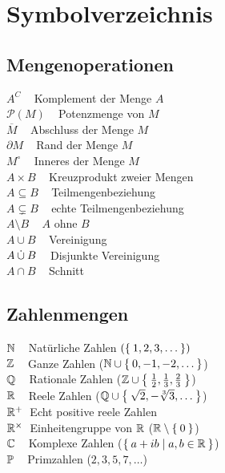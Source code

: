 \chapter*{Symbolverzeichnis}
\begin{minipage}[t]{0.45\textwidth}
\section*{Mengenoperationen}
$A^C\;\;\;$ Komplement der Menge $A$\\
$\mathcal{P}(M)\;\;\;$ Potenzmenge von $M$\\
$\overline{M}\;\;\;$ Abschluss der Menge $M$\\
$\partial M\;\;\;$ Rand der Menge $M$\\
$M^\circ\;\;\;$ Inneres der Menge $M$\\
$A \times B\;\;\;$ Kreuzprodukt zweier Mengen\\
$A \subseteq B\;\;\;$ Teilmengenbeziehung\\
$A \subsetneq B\;\;\;$ echte Teilmengenbeziehung\\
$A \setminus B\;\;\;$ $A$ ohne $B$\\
$A \cup B\;\;\;$ Vereinigung\\
$A \mathbin{\dot{\cup}} B\;\;\;$ Disjunkte Vereinigung\\
$A \cap B\;\;\;$ Schnitt\\
\section*{Zahlenmengen}
$\mathbb{N}\;\;\;$ Natürliche Zahlen $(\Set{1, 2, 3, \dots})$\\
$\mathbb{Z}\;\;\;$ Ganze Zahlen ($\mathbb{N} \cup \Set{0, -1, -2, \dots}$)\\
$\mathbb{Q}\;\;\;$ Rationale Zahlen ($\mathbb{Z} \cup \Set{\frac{1}{2}, \frac{1}{3}, \frac{2}{3}}$)\\
$\mathbb{R}\;\;\;$ Reele Zahlen ($\mathbb{Q} \cup \Set{\sqrt{2}, -\sqrt[3]{3}, \dots}$)\\
$\mathbb{R}^+\;$ Echt positive reele Zahlen\\
$\mathbb{R}^\times\;$ Einheitengruppe von $\mathbb{R}$ ($\mathbb{R} \setminus \Set{0}$)\\
$\mathbb{C}\;\;\;$ Komplexe Zahlen ($\Set{a+ib|a,b \in \ensuremath{\mathbb{R}}}$)\\
$\mathbb{P}\;\;\;$ Primzahlen ($2, 3, 5, 7, \dots$)\\
\end{minipage}
